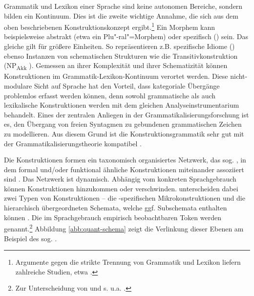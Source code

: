 
Grammatik und Lexikon einer Sprache sind keine autonomen Bereiche, sondern bilden ein Kontinuum. Dies ist die zweite wichtige Annahme, die sich aus dem oben beschriebenen  Konstruktionskonzept ergibt.\footnote{Argumente gegen die strikte Trennung von Grammatik und Lexikon liefern zahlreiche Studien, etwa \textcite{Goldberg2006}.} Ein Morphem kann beispielsweise abstrakt (etwa ein Plu"-ral"=Morphem) oder spezifisch () sein. Das gleiche gilt für größere Einheiten. So repräsentieren z.B. spezifische Idiome () ebenso Instanzen von schematischen Strukturen wie die Transitivkonstruktion  (NP\textsubscript{Akk} ). Gemessen an ihrer Komplexität und ihrer Schematizität können Konstruktionen im Grammatik-Lexikon-Kontinuum verortet werden. Diese nicht-modulare Sicht auf Sprache hat den Vorteil, dass kategoriale Übergänge problemlos erfasst werden können, denn sowohl grammatische als auch lexikalische Konstruktionen werden mit dem gleichen Analyseinstrumentarium behandelt. Eines der zentralen Anliegen in der Grammatikalisierungsforschung ist es, den Übergang von freien Syntagmen zu gebundenen grammatischen Zeichen zu modellieren. Aus diesem Grund ist die Konstruktionsgrammatik sehr gut mit der Grammatikalisierungstheorie kompatibel \parencite[zur weiterführenden Diskussion s. ][85]{Diewald2008}. 


Die Konstruktionen formen ein taxonomisch organisiertes Netzwerk, das sog.  \parencite{Ziem2013}, in dem formal und/oder funktional ähnliche Konstruktionen miteinander assoziiert sind \parencites()()[]{Langacker1987}[262ff.]{Croft2004}[]{Bybee2010}. Das Netzwerk ist dynamisch. Abhängig vom konkreten Sprachgebrauch können  Konstruktionen hinzukommen oder verschwinden. \textcite[17]{Traugott2013} unterscheiden dabei zwei Typen von Konstruktionen -- die -spezifischen Mikrokonstruktionen und die hierarchisch übergeordneten Schemata, welche ggf. Subschemata enthalten können \parencite[s. auch][]{Traugott2015}. Die im Sprachgebrauch empirisch beobachtbaren Token werden  genannt.\footnote{Zur Unterscheidung von  und  s. u.a. \textcite[][423]{Fried2013}.} Abbildung \ref{abb:quant-schema} zeigt die Verlinkung dieser Ebenen am Beispiel des sog.  \parencite[aus][17]{Traugott2013}. 

